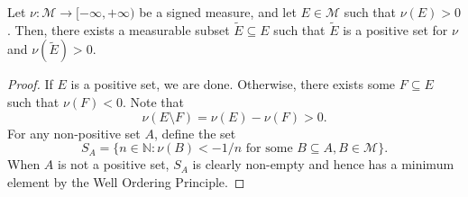 \documentclass[11pt]{article}
\newcommand{\N}{\mathbb{N}}
\newcommand{\M}{\mathcal{M}}
\theoremstyle{definition}
\theoremstyle{remark}
\begin{document}
    \begin{lemma}
        Let $\nu\colon \M \to [-\infty, +\infty)$ be a signed measure, and let $E \in
        \M$ such that $\nu(E) > 0$. Then, there exists a measurable subset $\tilde{E}
        \subseteq E$ such that $\tilde{E}$ is a positive set for $\nu$ and
        $\nu(\tilde{E}) > 0$.
    \end{lemma}
    \begin{proof}
        If $E$ is a positive set, we are done. Otherwise, there exists some $F
        \subseteq E$ such that $\nu(F) < 0$. Note that \[
            \nu(E\setminus F) = \nu(E) - \nu(F) > 0.
        \] For any non-positive set $A$, define the set \[
            S_A = \{n \in \N : \nu(B) < -1 / n \text{ for some } B \subseteq A, B \in
            \M\}.
        \] When $A$ is not a positive set, $S_A$ is clearly non-empty and hence has a
        minimum element by the Well Ordering Principle.


\end{proof}
\end{document}
